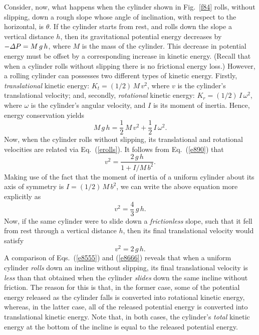 Consider, now, what happens when the cylinder shown in Fig.~\ref{f84} rolls,
without slipping, down a rough slope whose angle of inclination, with respect to the horizontal, is
$\theta$. If the cylinder starts from rest, and rolls down the slope a vertical distance
$h$, then its gravitational potential energy decreases by $-{\mit\Delta}P = M\,g\,h$,
where $M$ is the mass of the cylinder. This decrease in potential energy must be
offset by a corresponding increase in kinetic energy. (Recall that when a
cylinder rolls without slipping there is no frictional energy loss.) However, a rolling
cylinder can possesses two different types of kinetic energy. Firstly, {\em translational}
kinetic energy: $K_t = (1/2)\,M\,v^2$, where $v$ is the cylinder's translational
velocity; and, secondly, {\em rotational} kinetic energy: $K_r = (1/2)\,I\,\omega^2$, where $\omega$
is the cylinder's angular velocity, and $I$ is its moment of inertia. Hence,
energy conservation yields
\begin{equation}\label{e890}
M\,g\,h = \frac{1}{2}\,M\,v^2 + \frac{1}{2}\,I\,\omega^2.
\end{equation}
Now, when the cylinder rolls without slipping, its translational and rotational
velocities are related via Eq.~(\ref{erolls}). It follows from Eq.~(\ref{e890}) that
\begin{equation}
v^2 = \frac{2\,g\,h}{1+ I/M\,b^2}.
\end{equation}
Making use of the fact that the moment of inertia of a uniform cylinder about its
axis of symmetry is $I=(1/2)\,M\,b^2$, we can write the
above equation more explicitly as
\begin{equation}\label{e8555}
v^2 = \frac{4}{3}\, g\,h.
\end{equation}
Now, if the same cylinder were to slide down a {\em frictionless} slope,
such that it fell from rest through a vertical distance $h$, then
its final translational velocity would satisfy
\begin{equation}\label{e8666}
v^2 = 2\,g\,h.
\end{equation}
A comparison of Eqs.~(\ref{e8555}) and (\ref{e8666}) reveals that when a uniform
cylinder {\em rolls} down an incline without slipping, its final translational
velocity is {\em less} than that obtained when the cylinder {\em slides} down the same
incline without friction. The reason for this is that, in the former case,
some of the potential energy released as the cylinder falls is converted into
rotational kinetic energy, whereas, in the latter case, all of the
released potential energy is converted into translational kinetic energy.
Note that, in both cases, the cylinder's {\em total} kinetic energy 
at the bottom of the incline is equal to the released potential
energy.

